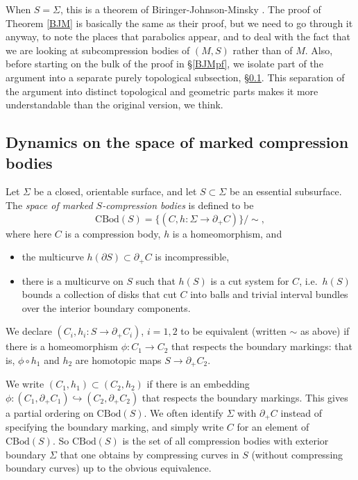 \documentclass[12pt]{amsart}
\theoremstyle{definition}
\theoremstyle{remark}
\newcommand{\into}{\hookrightarrow}
\begin{document}
When $S=\Sigma$, this is a theorem of Biringer-Johnson-Minsky \cite{Biringerextending}. The proof of Theorem \ref{BJM} is basically the same as their proof, but we need to go through it anyway, to note the places that parabolics appear, and to deal with the fact that we are looking at subcompression bodies of $(M,S)$ rather than of $M$. Also, before starting on the bulk of the proof in \S \ref{BJMpf}, we isolate part of the argument into a separate purely topological subsection, \S \ref{sec:topologicaliteration}. This separation of the argument into distinct topological and geometric parts makes it more understandable than the original version, we think.

\subsection{Dynamics on the space of marked compression bodies}

\label {sec:topologicaliteration}
Let $\Sigma$ be a closed, orientable surface, and let $S\subset \Sigma$ be an essential subsurface. The \emph {space of marked $S$-compression bodies} is defined to be 
$$\mathrm {CBod}(S) = \{  (C,h:\Sigma \to \partial_+ C) \}/\sim, $$
where here $C$ is a compression body, $h$ is a homeomorphism, and
\begin{itemize}
	\item the multicurve $h(\partial S)\subset \partial_+C$ is incompressible,
	\item there is a multicurve on $S$ such that $h(S)$ is a cut system for $C$, i.e.\ $h(S)$ bounds a collection of disks that cut $C$ into balls and trivial interval bundles over the interior boundary components.
\end{itemize} We declare $(C_i,h_i:S \to \partial_+ C_i)$, $i=1,2$ to be equivalent (written $\sim$ as above) if there is a homeomorphism $\phi : C_1\to C_2$ that respects the boundary markings: that is, $\phi \circ h_1$ and $h_2$ are homotopic maps $S \to \partial_+ C_2$.

We write $(C_1,h_1) \subset (C_2,h_2)$ if there is an embedding $\phi: (C_1,\partial_+ C_1) \into (C_2,\partial_+ C_2)$ that respects the boundary markings. This gives a partial ordering on $\mathrm {CBod}(S)$.  We often identify $\Sigma$ with $\partial_+ C$ instead of specifying the boundary marking, and simply write $C$ for an element of $\mathrm {CBod}(S)$.  So $\mathrm{CBod}(S)$ is the set of all compression bodies with exterior boundary $\Sigma$ that one obtains by compressing curves in $S$ (without compressing boundary curves) up to the obvious equivalence.
\end{document}
